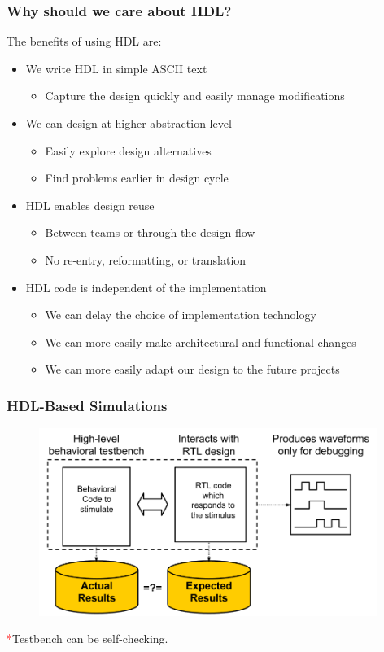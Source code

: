 \documentclass[t]{beamer}
\begin{document}
\begin{frame}
\frametitle{Why should we care about HDL?}

The benefits of using HDL are:
\newline

\begin{itemize}
\item We write HDL in simple ASCII text
\begin{itemize}
	\item Capture the design quickly and easily manage modifications
\end{itemize}
\item We can design at higher abstraction level
\begin{itemize}
	\item Easily explore design alternatives
	\item Find problems earlier in design cycle
\end{itemize}
\item HDL enables design reuse
\begin{itemize}
	\item Between teams or through the design flow
	\item No re-entry, reformatting, or translation
\end{itemize}
\item HDL code is independent of the implementation
\begin{itemize}
	\item We can delay the choice of implementation technology
	\item We can more easily make architectural and functional changes
	\item We can more easily adapt our design to the future projects
\end{itemize}
\end{itemize}

\end{frame}

\begin{frame}
\frametitle{HDL-Based Simulations}

\begin{figure}[H!]
    \includegraphics[width=0.98\textwidth]{img/01_sim.png}
\end{figure}

\textcolor{red}*Testbench can be self-checking.


\end{frame}
\end{document}
